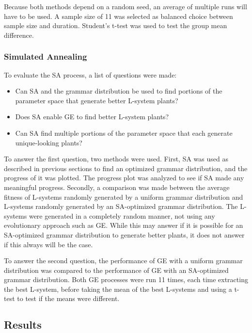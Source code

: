 Because both methods depend on a random seed, an average of multiple runs will have to be used.
A sample size of 11 was selected as balanced choice between sample size and duration.
Student's t-test was used to test the group mean difference.

\subsubsection{Simulated Annealing}
To evaluate the SA process, a list of questions were made:
\begin{itemize}
	\item Can SA and the grammar distribution be used to find portions of the parameter space that generate better L-system plants?
	\item Does SA enable GE to find better L-system plants?
	\item Can SA find multiple portions of the parameter space that each generate unique-looking plants?
\end{itemize}
To answer the first question, two methods were used.
First, SA was used as described in previous sections to find an optimized grammar distribution, and the progress of it was plotted.
The progress plot was analyzed to see if SA made any meaningful progress.
Secondly, a comparison was made between the average fitness of L-systems randomly generated by a uniform grammar distribution and L-systems randomly generated by an SA-optimized grammar distribution.
The L-systems were generated in a completely random manner, not using any evolutionary approach such as GE.
While this may answer if it is possible for an SA-optimized grammar distribution to generate better plants, it does not answer if this always will be the case.

To answer the second question, the performance of GE with a uniform grammar distribution was compared to the performance of GE with an SA-optimized grammar distribution.
Both GE processes were run 11 times, each time extracting the best L-system, before taking the mean of the best L-systems and using a t-test to test if the means were different.

\subsection{Results}

